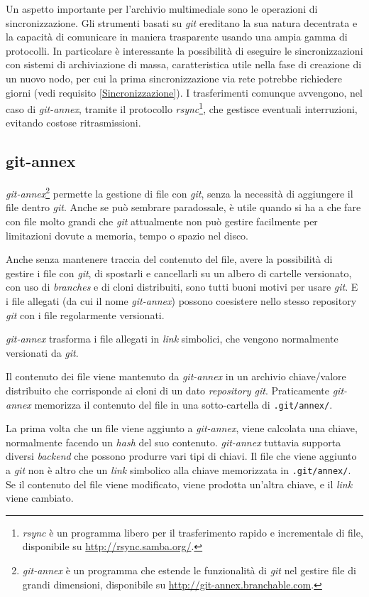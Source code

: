 Un aspetto importante per l'archivio multimediale sono le operazioni
di sincronizzazione. Gli strumenti basati su \emph{git} ereditano la
sua natura decentrata e la capacità di comunicare in maniera
trasparente usando una ampia gamma di protocolli. In particolare è
interessante la possibilità di eseguire le sincronizzazioni con
sistemi di archiviazione di massa, caratteristica utile nella fase di
creazione di un nuovo nodo, per cui la prima sincronizzazione via rete
potrebbe richiedere giorni (vedi requisito \ref{Sincronizzazione}). I
trasferimenti comunque avvengono, nel caso di \emph{git-annex},
tramite il protocollo \emph{rsync}\footnote{\emph{rsync} è un
  programma libero per il trasferimento rapido e incrementale di file,
  disponibile su \url{http://rsync.samba.org/}.}, che gestisce
eventuali interruzioni, evitando costose ritrasmissioni.

\subsection{git-annex}\label{git-annex}
\emph{git-annex}\footnote{\emph{git-annex} è un programma che estende
  le funzionalità di \emph{git} nel gestire file di grandi dimensioni,
  disponibile su \url{http://git-annex.branchable.com}.} permette la
gestione di file con \emph{git}, senza la necessità di aggiungere il
file dentro \emph{git}. Anche se può sembrare paradossale, è utile
quando si ha a che fare con file molto grandi che \emph{git}
attualmente non può gestire facilmente per limitazioni dovute a
memoria, tempo o spazio nel disco.

Anche senza mantenere traccia del contenuto del file, avere la 
possibilità di gestire i file con \emph{git}, di spostarli e cancellarli su un
albero di cartelle versionato, con uso di \emph{branches} e di cloni
distribuiti, sono tutti buoni motivi per usare \emph{git}. E i file allegati
(da cui il nome \emph{git-annex}) possono coesistere nello stesso repository
\emph{git} con i file regolarmente versionati.

\emph{git-annex} trasforma i file allegati in \emph{link}
simbolici, che vengono normalmente versionati da \emph{git}. 

Il contenuto dei file viene mantenuto da \emph{git-annex} in un
archivio chiave/valore distribuito che corrisponde ai cloni di un
dato \emph{repository git}. Praticamente \emph{git-annex} memorizza il
contenuto del file in una sotto-cartella di \verb|.git/annex/|.

La prima volta che un file viene aggiunto a \emph{git-annex}, viene
calcolata una chiave, normalmente facendo un \emph{hash} del suo
contenuto. \emph{git-annex} tuttavia supporta diversi \emph{backend}
che possono produrre vari tipi di chiavi. Il file che viene aggiunto a
\emph{git} non è altro che un \emph{link} simbolico alla chiave
memorizzata in \verb|.git/annex/|. Se il contenuto del file viene
modificato, viene prodotta un'altra chiave, e il \emph{link} viene
cambiato.

